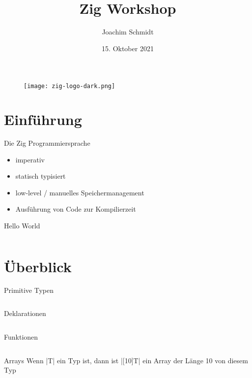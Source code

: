 \documentclass[aspectratio=169]{beamer}
\title{Zig Workshop}
\author{Joachim Schmidt}
\date{15. Oktober 2021}
\begin{document}

\begin{frame}{}
  \begin{figure}
    \centering
    \texttt{[image: zig-logo-dark.png]}
    \caption{\cite{logo}}
    \label{fig:logo}
  \end{figure}
\end{frame}

\begin{frame}{}
  \tableofcontents
\end{frame}

\section{Einführung}

\begin{frame}{Die Zig Programmiersprache}
  \begin{itemize}
  \item imperativ
  \item statisch typisiert
  \item low-level / manuelles Speichermanagement
  \item Ausführung von Code zur Kompilierzeit
  \end{itemize}
\end{frame}

\begin{frame}{Hello World}
  \inputminted[linenos]{zig}{examples/hello.zig}
\end{frame}

\section{Überblick}

\begin{frame}{Primitive Typen}
  \inputminted[linenos]{zig}{examples/primitive_types.zig}
\end{frame}

\begin{frame}{Deklarationen}
  \inputminted[linenos]{zig}{examples/decls.zig}
\end{frame}

\begin{frame}{Funktionen}
  \inputminted[linenos]{zig}{examples/functions.zig}
\end{frame}

\begin{frame}{Arrays}
  Wenn |T| ein Typ ist, dann ist |[10]T| ein Array der Länge 10 von diesem Typ
  \inputminted[linenos]{zig}{examples/arrays.zig}
\end{frame}
\end{document}
